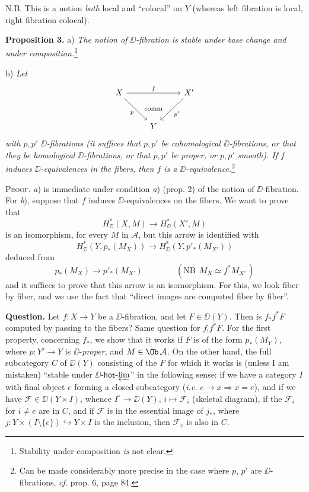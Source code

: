 N.B. This is a notion \textit{both} local and ``colocal'' on $Y$ (whereas left fibration is local, right fibration colocal).


\textbf{Proposition 3.} a) \textit{The notion of $\DD$-fibration is stable under base change and under composition.}\footnote[38]{Stability under composition \textit{is} not clear.}

\indent b) \textit{Let}
\[
\begin{tikzcd}[column sep=normal, row sep=large]
X \arrow[rr, "f"] \arrow[dr, "p"'] & \phantom{X} & X' \arrow[dl, "p'"] \\
& Y &
\arrow[from=1-2, to=2-2, phantom, "\text{\footnotesize comm}"]
\end{tikzcd}
\]
\textit{with $p,p'$ $\DD$-fibrations (it suffices that $p,p'$ be cohomological $\DD$-fibrations, or that they be homological $\DD$-fibrations, or that $p,p'$ be proper, or $p,p'$ smooth). If $f$ induces $\DD$-equivalences in the fibers, then $f$ is a $\DD$-equivalence.}\footnote[39]{Can be made considerably more precise in the case where $p$, $p'$ are $\DD$-fibrations, \textit{cf.} prop. 6, page 84.}

\indent\textsc{Proof.} \textit{a}) is immediate under condition \textit{a}) (prop. 2) of the notion of $\DD$-fibration. For \textit{b}), suppose that $f$ induces $\DD$-equivalences on the fibers. We want to prove that %
\[
H^*_{\DD}(X,M) \longrightarrow H^*_{\DD}(X',M)
\]
is an isomorphism, for every $M$ in $\mathcal{A}$, but this arrow is identified with
\[
H^*_{\DD}(Y, p_*(M_X)) \longrightarrow H^*_{\DD}(Y, p'_*(M_{X'}))
\]
deduced from
\[
p_*(M_X) \longrightarrow p'_*(M_{X'}) \qquad\qquad (\text{NB}\ \ M_X \simeq f^*M_{X'}\,)
\]
and it suffices to prove that this arrow is an isomorphism. For this, we look fiber by fiber, and we use the fact that ``direct images are computed fiber by fiber''.

\textbf{Question.} Let $f : X \to Y$ be a $\DD$-fibration, and let $F \in \DD(Y)$. Then is $f_*f^*F$ computed by passing to the fibers? Same question for $f_!f^*F$. For the first property, concerning $f_*$, we show that it works if $F$ is of the form $p_*(M_Y)$, where $p : Y' \to Y$ is $\DD$-\textit{proper,} and $M \in \Ob\, \mathcal{A}$. On the other hand, the full subcategory $C$ of $\DD(Y)$ consisting of the $F$ for which it works is (unless I am mistaken) ``stable under $\DD$-$\mathsf{hot}$-$\varprojlim$'' in the following sense: if we have a category $I$ with final object $e$ forming a closed subcategory (\textit{i.e.} $e \to x \Rightarrow x = e$), and if we have $\mathcal{F} \in \DD(Y \times I)$, whence $I^\circ \to \DD(Y)$, $i \mapsto \mathcal{F}_i$ (skeletal diagram), if the $\mathcal{F}_i$ for $i \neq e$ are in $C$, and if $\mathcal{F}$ is in the essential image of $j_*$, where $j : Y \times (I \setminus \{e\}) \hookrightarrow Y \times I$ is the inclusion, then $\mathcal{F}_e$ is also in $C$.

